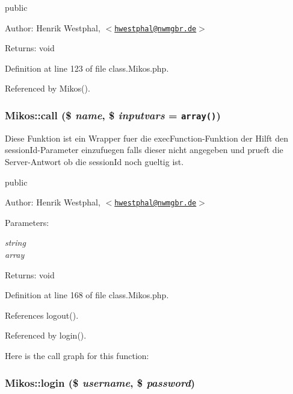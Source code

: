 public \begin{Desc}
\item[Author:]Henrik Westphal, $<$\href{mailto:hwestphal@nwmgbr.de}{\tt hwestphal@nwmgbr.de}$>$ \end{Desc}
\begin{Desc}
\item[Returns:]void \end{Desc}


Definition at line 123 of file class.Mikos.php.

Referenced by Mikos().\hypertarget{class_mikos_a23685bf95bd7af11c0a0a2f6f1d2159}{
\subsubsection{\setlength{\rightskip}{0pt plus 5cm}Mikos::call (\$ {\em name}, \$ {\em inputvars} = {\tt array()})}}
\label{class_mikos_a23685bf95bd7af11c0a0a2f6f1d2159}


Diese Funktion ist ein Wrapper fuer die execFunction-Funktion der Hilft den sessionId-Parameter einzufuegen falls dieser nicht angegeben und prueft die Server-Antwort ob die sessionId noch gueltig ist.

public \begin{Desc}
\item[Author:]Henrik Westphal, $<$\href{mailto:hwestphal@nwmgbr.de}{\tt hwestphal@nwmgbr.de}$>$ \end{Desc}
\begin{Desc}
\item[Parameters:]
\begin{description}
\item[{\em string}]\item[{\em array}]\end{description}
\end{Desc}
\begin{Desc}
\item[Returns:]void \end{Desc}


Definition at line 168 of file class.Mikos.php.

References logout().

Referenced by login().

Here is the call graph for this function:\hypertarget{class_mikos_539ff1a8891af79abcc16ed355982bef}{
\subsubsection{\setlength{\rightskip}{0pt plus 5cm}Mikos::login (\$ {\em username}, \$ {\em password})}}
\label{class_mikos_539ff1a8891af79abcc16ed355982bef}


